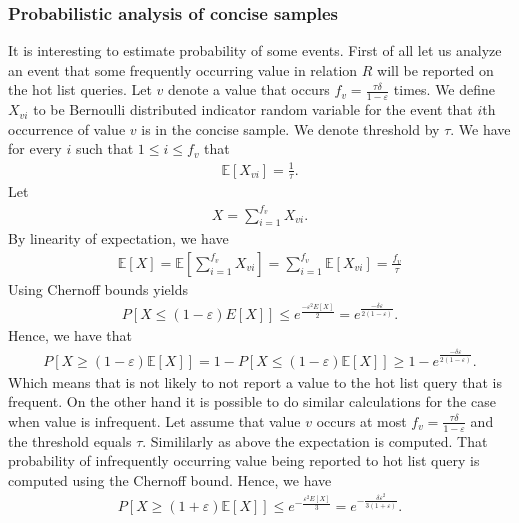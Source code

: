 \subsubsection{Probabilistic analysis of concise samples}
It is interesting to estimate probability of some events.
First of all let us analyze an event that some frequently occurring value in
relation $R$ will be reported on the hot list queries. Let $v$ denote a
value that occurs $f_v = \frac{\tau \delta}{1 - \varepsilon}$
times. We define $X_{vi}$ to be Bernoulli distributed indicator random
variable for the event that $i$th occurrence of value $v$ is in the
concise sample. We denote threshold by $\tau$. We have for
every $i$ such that $1 \leq i \leq f_v$ that
\begin{align*}
\mathbb{E}[X_{vi}] = \frac{1}{\tau}.
\end{align*}
Let
\begin{align*}
  X = \sum_{i = 1}^{f_v} X_{vi}.
\end{align*}
By linearity of expectation, we have
\begin{align*}
  \mathbb{E}[X]
  = \mathbb{E}[\sum_{i=1}^{f_v} X_{vi}] = \sum_{i=1}^{f_v}
  \mathbb{E}[X_{vi}] = \frac{f_v}{\tau}
\end{align*}
%
Using Chernoff bounds yields
\begin{align*}
  P[X \leq (1-\varepsilon)E[X]] \leq e^{\frac{-\varepsilon^2 E[X]
    }{2}} = e^{\frac{-\delta \varepsilon}{2(1-\varepsilon)}}.
\end{align*}
Hence, we have that
\begin{align*}
  P[X \geq (1-\varepsilon)\mathbb{E}[X]] = 1 - P[X \leq
  (1-\varepsilon)\mathbb{E}[X]] \geq 1 - e^{\frac{-\delta \varepsilon}{2(1-\varepsilon)}}.
\end{align*}
Which means that is not likely to not report a value to the hot list
query that is frequent.
On the other hand it is possible to do similar calculations for the
case when value is infrequent. Let assume that value $v$ occurs at
most $f_v = \frac{\tau\delta}{1-\varepsilon}$ and the threshold equals
$\tau$. Simililarly as above the expectation is computed.
That probability of infrequently occurring value being reported to hot
list query is computed using the Chernoff bound.  Hence, we have
\begin{align*}
P[X \geq (1+\varepsilon)\mathbb{E}[X]] \leq e^{-\frac{\varepsilon^2
    E[X]}{3} } = e^{-\frac{\delta \varepsilon^2}{3(1+\varepsilon)}}.
\end{align*}

